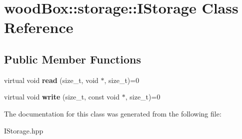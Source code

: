 \hypertarget{classwood_box_1_1storage_1_1_i_storage}{}\section{wood\+Box\+:\+:storage\+:\+:I\+Storage Class Reference}
\label{classwood_box_1_1storage_1_1_i_storage}
\subsection*{Public Member Functions}
\begin{DoxyCompactItemize}
\item 
\mbox{\label{classwood_box_1_1storage_1_1_i_storage_a01bab924be0844e3866b27279caa506d}} 
virtual void {\bfseries read} (size\+\_\+t, void $\ast$, size\+\_\+t)=0
\item 
\mbox{\label{classwood_box_1_1storage_1_1_i_storage_a5eb82c922e8a3147ddab510706be8e24}} 
virtual void {\bfseries write} (size\+\_\+t, const void $\ast$, size\+\_\+t)=0
\end{DoxyCompactItemize}


The documentation for this class was generated from the following file\+:\begin{DoxyCompactItemize}
\item 
I\+Storage.\+hpp\end{DoxyCompactItemize}
